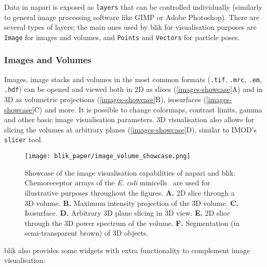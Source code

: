 Data in napari is exposed as \texttt{layers} that can be controlled individually (similarly to general image processing software like GIMP or Adobe Photoshop). There are several types of layers; the main ones used by blik for visualisation purposes are \texttt{Image} for images and volumes, and \texttt{Points} and \texttt{Vectors} for particle poses.

\subsubsection{Images and Volumes}\label{images-and-volumes}

Images, image stacks and volumes in the most common formats (\texttt{.tif}, \texttt{.mrc}, \texttt{.em}, \texttt{.hdf}) can be opened and viewed both in 2D as slices (\autoref{images-showcase}A) and in 3D as volumetric projections (\autoref{images-showcase}B), isosurfaces (\autoref{images-showcase}C) and more. It is possible to change colormaps, contrast limits, gamma and other basic image visualisation parameters. 3D visualisation also allows for slicing the volumes at arbitrary planes (\autoref{images-showcase}D), similar to IMOD's \texttt{slicer} tool.

\begin{figure}[!ht]
    \centering
    \texttt{[image: blik\_paper/image\_volume\_showcase.png]}
    \caption[Volume visualisations]{Showcase of the image visualisation capabilities of napari and blik. Chemoreceptor arrays of the \textit{E. coli} minicells~\cite{burtCompleteStructureChemosensory2020} are used for illustrative purposes throughout the figures. \textbf{A.} 2D slice through a 3D volume. \textbf{B.} Maximum intensity projection of the 3D volume. \textbf{C.} Isosurface. \textbf{D.} Arbitrary 3D plane slicing in 3D view. \textbf{E.} 2D slice through the 3D power spectrum of the volume. \textbf{F.} Segmentation (in semi-transparent brown) of 3D objects.}
    \label{images-showcase}
\end{figure}

blik also provides some widgets with extra functionality to complement image visualisation:

